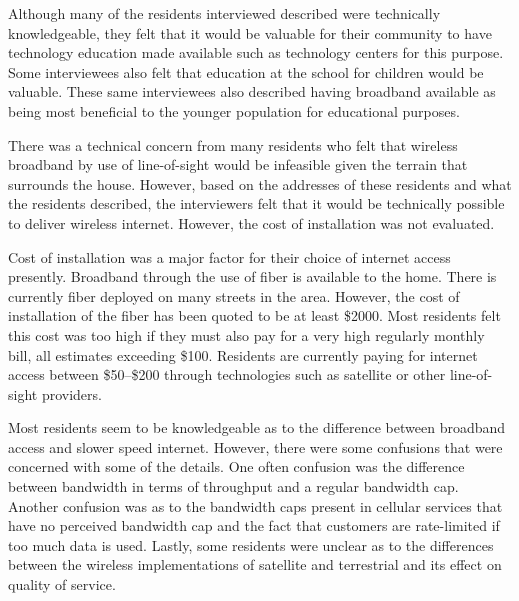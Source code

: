 Although many of the residents interviewed described were technically knowledgeable, they felt
that it would be valuable for their community to have technology education made available such
as technology centers for this purpose. Some interviewees also felt that education at the school
for children would be valuable. These same interviewees also described having broadband available
as being most beneficial to the younger population for educational purposes.

There was a technical concern from many residents who felt that wireless broadband by use of
line-of-sight would be infeasible given the terrain that surrounds the house. However, based
on the addresses of these residents and what the residents described, the interviewers felt
that it would be technically possible to deliver wireless internet. However, the cost of
installation was not evaluated.

Cost of installation was a major factor for their choice of internet access presently. Broadband
through the use of fiber is available to the home. There is currently fiber deployed on many
streets in the area. However, the cost of installation of the fiber has been quoted to be at least \$2000.
Most residents felt this cost was too high if they must also pay for a very high regularly monthly bill, all
estimates exceeding \$100. Residents are currently paying for internet access between \$50--\$200
through technologies such as satellite or other line-of-sight providers.

Most residents seem to be knowledgeable as to the difference between broadband access and slower speed internet.
However, there were some confusions that were concerned with some of the details. One often confusion was
the difference between bandwidth in terms of throughput and a regular bandwidth cap. Another confusion was
as to the bandwidth caps present in cellular services that have no perceived bandwidth cap and the fact that
customers are rate-limited if too much data is used. Lastly, some residents were unclear as to the differences
between the wireless implementations of satellite and terrestrial and its effect on quality of service.


